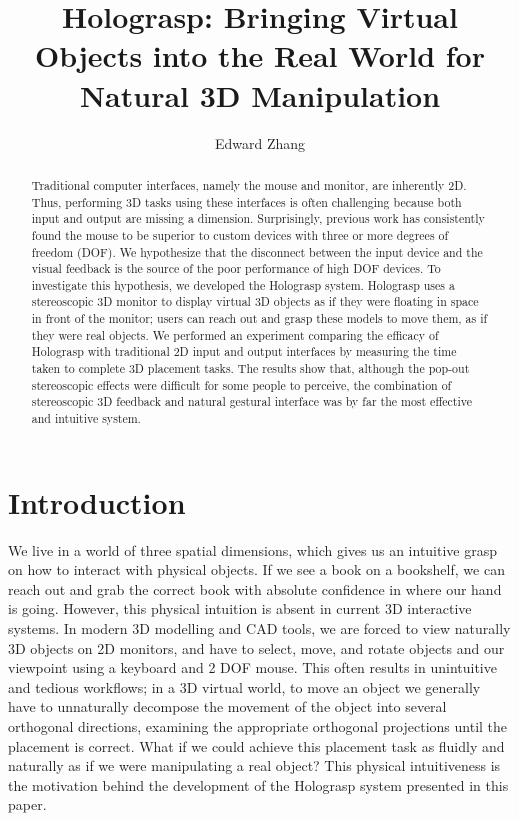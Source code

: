 \documentclass[pageno]{jpaper}
\begin{document}
\title{Holograsp: Bringing Virtual Objects into the Real World for Natural 3D Manipulation}

\date{}
\author{Edward Zhang}
\maketitle
\onehalfspace
\thispagestyle{empty}

\begin{abstract}
Traditional computer interfaces, namely the mouse and monitor, are inherently 2D. Thus, performing 3D tasks using
these interfaces is often challenging because both input and output are missing a dimension. Surprisingly,
previous work has consistently found the mouse to be superior to custom devices with three or more degrees
of freedom (DOF). We hypothesize that the disconnect between the input device and the visual feedback is the
source of the poor performance of high DOF devices. To investigate this hypothesis, we developed the Holograsp
system. Holograsp uses a stereoscopic 3D monitor to display virtual 3D objects as if they were floating in
space in front of the monitor; users can reach out and grasp these models to move them, as if they were real
objects. We performed an experiment comparing the efficacy of Holograsp with traditional 2D input and output
interfaces by measuring the time taken to complete 3D placement tasks. The results show that, although the
pop-out stereoscopic effects were difficult for some people to perceive, the combination of stereoscopic 3D
feedback and natural gestural interface was by far the most effective and intuitive system.
\end{abstract}

\newpage
\tableofcontents
\newpage

\section{Introduction}
We live in a world of three spatial dimensions, which gives us an intuitive grasp on how to interact with
physical objects. If we see a book on a bookshelf, we can reach out and grab the correct book with
absolute confidence in where our hand is going. However, this physical intuition is absent in current 3D interactive
systems. In modern 3D modelling and CAD tools, we are forced to view naturally 3D objects on 2D monitors, and have to
select, move, and rotate objects and our viewpoint using a keyboard and 2 DOF mouse. This often results in unintuitive and
tedious workflows; in a 3D virtual world, to move an object we generally have to unnaturally decompose the movement of the
object into several orthogonal directions, examining the appropriate orthogonal projections until the placement is correct.
What if we could achieve this placement task as fluidly and naturally as if we were manipulating a real object? This
physical intuitiveness is the motivation behind the development of the Holograsp system presented in this paper.
\end{document}
